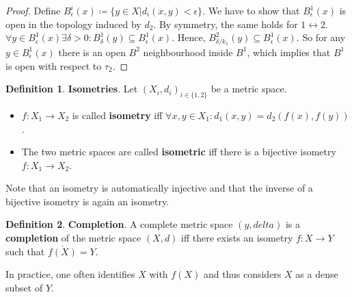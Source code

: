 \documentclass[10pt,a4paper]{article}
\theoremstyle{definition}
\newtheorem{definition}{Definition}
\theoremstyle{cor}
\theoremstyle{theorem}
\theoremstyle{lemma}
\theoremstyle{example}
\theoremstyle{remark}
\begin{document}
\begin{proof}
Define $B_{\epsilon}^{i}(x) \coloneq \{ y\in X | d_i(x, y) < \epsilon\}$. We have to show that $B_{\epsilon}^{1}(x)$ is open in the topology induced by $d_2$. By symmetry, the same holds for $1\leftrightarrow 2$. $\forall y \in B_{\epsilon}^{1}(x) \exists \delta > 0 : B_{\delta}^{1}(y) \subseteq B_{\epsilon}^{1}(x)$. Hence, $B_{\delta/k_1}^{2}(y) \subseteq B_{\epsilon}^{1}(x)$. So for any $y\in B_{\epsilon}^{1}(x)$ there is an open $B^{2}$ neighbourhood inside $B^{1}$, which implies that $B^{1}$ is open with respect to $\tau_2$.
\end{proof}

\begin{definition}
\textbf{Isometries}. Let $(X_i, d_i)_{i \in \{1,2\}}$ be a metric space.
\begin{itemize}
\item $f: X_1 \rightarrow X_2$ is called \textbf{isometry} iff $\forall x,y\in X_1: d_1(x, y) = d_2(f(x), f(y))$.
\item The two metric spaces are called \textbf{isometric} iff there is a bijective isometry $f: X_1 \rightarrow X_2$.
\end{itemize}
\end{definition}
\noindent Note that an isometry is automatically injective and that the inverse of a bijective isometry is again an isometry.
\begin{definition} 
\textbf{Completion}. A complete metric space $(y, delta)$ is a \textbf{completion} of the metric space $(X, d)$ iff there exists an isometry $f: X\rightarrow Y$ such that $\overline{f(X)} = Y $.
\end{definition}
\noindent In practice, one often identifies $X$ with $f(X)$ and thus considers $X$ as a dense subset of $Y$.
\end{document}
